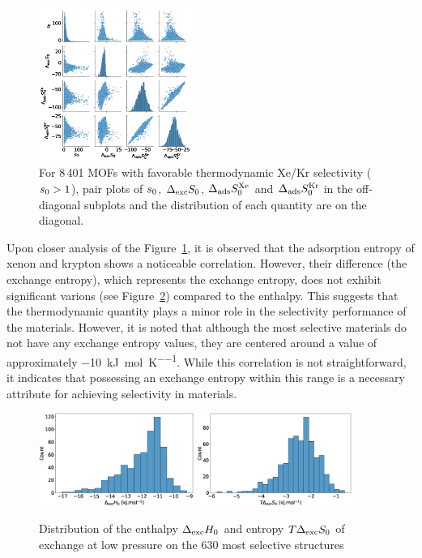 \documentclass[main.tex]{subfiles}
\begin{document}
\begin{figure}[ht]
  \centering
    \includegraphics[width=0.45\textwidth]{figures/2-thermo/Entropy_0.jpg}
    \caption{For 8\,401 MOFs with favorable thermodynamic Xe/Kr selectivity ($s_{\text{0}} > 1$), pair plots of $s_{\text{0}}$, $\Delta_{\text{exc}}S_{\text{0}}$, $\Delta_{\text{ads}}S^{\text{Xe}}_{\text{0}}$ and $\Delta_{\text{ads}}S^{\text{Kr}}_{\text{0}}$ in the off-diagonal subplots and the distribution of each quantity are on the diagonal.}\label{fgr:SI:HS_0_log}
\end{figure}

Upon closer analysis of the Figure~\ref{fgr:SI:HS_0_log}, it is observed that the adsorption entropy of xenon and krypton shows a noticeable correlation. However, their difference (the exchange entropy), which represents the exchange entropy, does not exhibit significant varions (see Figure~\ref{fgr:SI:dist0}) compared to the enthalpy. This suggests that the thermodynamic quantity plays a minor role in the selectivity performance of the materials. However, it is noted that although the most selective materials do not have any exchange entropy values, they are centered around a value of approximately \SI{-10}{\kilo\joule\per\mole\per\kelvin}. While this correlation is not straightforward, it indicates that possessing an exchange entropy within this range is a necessary attribute for achieving selectivity in materials.

\begin{figure}[ht]
  \centering
    \includegraphics[width=0.45\textwidth]{figures/2-thermo/Delta_H_0.jpg}
    \includegraphics[width=0.45\textwidth]{figures/2-thermo/T_Delta_S_0.jpg}
    \caption{Distribution of the enthalpy $\Delta_{\text{exc}}H_{\text{0}}$ and entropy $T\Delta_{\text{exc}}S_{\text{0}}$ of exchange at low pressure on the 630 most selective structures}\label{fgr:SI:dist0}
\end{figure}
\end{document}
